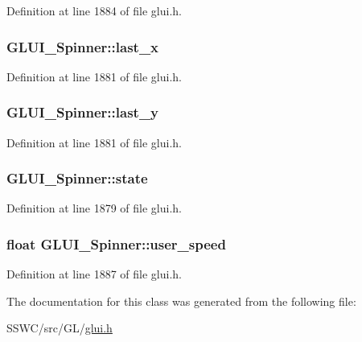 Definition at line 1884 of file glui.\+h.

\hypertarget{class_g_l_u_i___spinner_ad0d43635b0af6fd45a572fef06713a72}{
\subsubsection[{last\+\_\+x}]{ G\+L\+U\+I\+\_\+\+Spinner\+::last\+\_\+x}}\label{class_g_l_u_i___spinner_ad0d43635b0af6fd45a572fef06713a72}


Definition at line 1881 of file glui.\+h.

\hypertarget{class_g_l_u_i___spinner_a084b7bf9051c1126c0b946f7cfcad1b0}{
\subsubsection[{last\+\_\+y}]{ G\+L\+U\+I\+\_\+\+Spinner\+::last\+\_\+y}}\label{class_g_l_u_i___spinner_a084b7bf9051c1126c0b946f7cfcad1b0}


Definition at line 1881 of file glui.\+h.

\hypertarget{class_g_l_u_i___spinner_a3cc462c96971813519080f0647c64754}{
\subsubsection[{state}]{ G\+L\+U\+I\+\_\+\+Spinner\+::state}}\label{class_g_l_u_i___spinner_a3cc462c96971813519080f0647c64754}


Definition at line 1879 of file glui.\+h.

\hypertarget{class_g_l_u_i___spinner_a436397a68c2a7a5a891e6476a70d2807}{
\subsubsection[{user\+\_\+speed}]{\setlength{\rightskip}{0pt plus 5cm}float G\+L\+U\+I\+\_\+\+Spinner\+::user\+\_\+speed}}\label{class_g_l_u_i___spinner_a436397a68c2a7a5a891e6476a70d2807}


Definition at line 1887 of file glui.\+h.



The documentation for this class was generated from the following file\+:\begin{DoxyCompactItemize}
\item 
S\+S\+W\+C/src/\+G\+L/\hyperlink{glui_8h}{glui.\+h}\end{DoxyCompactItemize}
